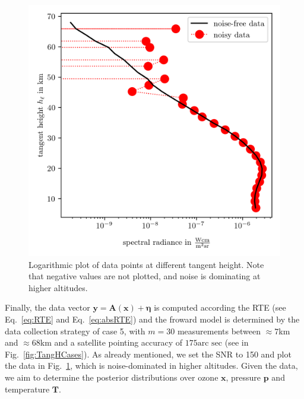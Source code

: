 
\begin{figure}[th!]
	\centering
	\includegraphics{DataPlot.png}
	\caption[Logarithmic plot of data points at different tangent height.]{Logarithmic plot of data points at different tangent height. Note that negative values are not plotted, and noise is dominating at higher altitudes.}
	\label{fig:DataPlot}
\end{figure}

Finally, the data vector $\bm{y} = \bm{A}(\bm{x}) + \bm{\eta} $ is computed according the RTE (see Eq.~\ref{eq:RTE} and Eq.~\ref{eq:absRTE}) and the froward model is determined by the data collection strategy of case 5, with $m = 30$ measurements between $\approx 7$km and $\approx 68$km and a satellite pointing accuracy of $175\text{arc sec}$ (see in Fig.~\ref{fig:TangHCases}).
As already mentioned, we set the SNR to 150 and plot the data in Fig.~\ref{fig:DataPlot}, which is noise-dominated in higher altitudes.
Given the data, we aim to determine the posterior distributions over ozone $\bm{x}$, pressure $\bm{p}$ and temperature $\bm{T}$.
\clearpage
